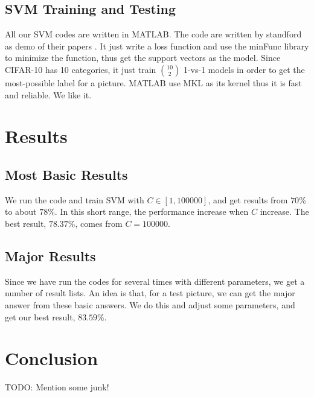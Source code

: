 \documentclass[12pt,abstract=true]{scrartcl}
\numberwithin{equation}{section}
\theoremstyle{definition}   \newtheorem{definition}{Definition}[section]
\theoremstyle{plain}        \newtheorem{theorem}{Theorem}[section]
\theoremstyle{plain}        \newtheorem{observation}{Observation}[section]
\theoremstyle{plain}        \newtheorem{fact}{Fact}[section]
\theoremstyle{plain}        \newtheorem{claim}{Claim}[section]
\theoremstyle{plain}        \newtheorem{lemma}[theorem]{Lemma}
\theoremstyle{plain}        \newtheorem{corollary}[theorem]{Corollary}
\theoremstyle{remark}       \newtheorem{example}{Example}[section]
\theoremstyle{remark}       \newtheorem{remark}{Remark}[section]
\newcommand{\scorebest}{$83.59\%$}
\newcommand{\scorebasic}{$78.37\%$}
\begin{document}
	\subsection{SVM Training and Testing}
		All our SVM codes are written in MATLAB.
		The code are written by standford as demo of their papers \cite{rf}\cite{singlelayer}.
		It just write a loss function and use the minFunc library
			to minimize the function,
			thus get the support vectors as the model.
		Since CIFAR-10 has 10 categories,
			it just train $\binom{10}{2}$ 1-vs-1 models
			in order to get the most-possible label for a picture.
		MATLAB use MKL as its kernel thus it is fast and reliable.
		We like it.

\section{Results}
	\subsection{Most Basic Results}
		We run the code and train SVM with $C\in[1,100000]$,
			and get results from $70\%$ to about $78\%$.
		In this short range,
			the performance increase when $C$ increase.
		The best result, \scorebasic, comes from $C=100000$.
	
	\subsection{Major Results}
		Since we have run the codes for several times with different parameters,
			we get a number of result lists.
		An idea is that, for a test picture, we can get the major answer from
			these basic answers.
		We do this and adjust some parameters, and get our
			best result, \scorebest.

\section{Conclusion}
		{\color{red}TODO: Mention some junk!}
	


\end{document}
